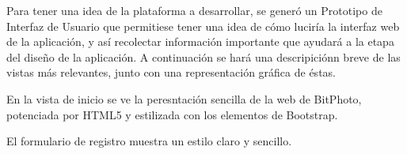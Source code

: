 \documentclass{memoria}
\begin{document}




Para tener una idea de la plataforma a desarrollar, se generó un Prototipo de Interfaz de Usuario que permitiese tener una idea de cómo luciría la interfaz web de la aplicación, y así recolectar información importante que ayudará a la etapa del diseño de la aplicación. A continuación se hará una descripiciónn breve de las vistas más relevantes, junto con una representación gráfica de éstas.


En la vista de inicio se ve la peresntación sencilla de la web de BitPhoto, potenciada por HTML5 y estilizada con los elementos de Bootstrap.

El formulario de registro muestra un estilo claro y sencillo.
\end{document}
